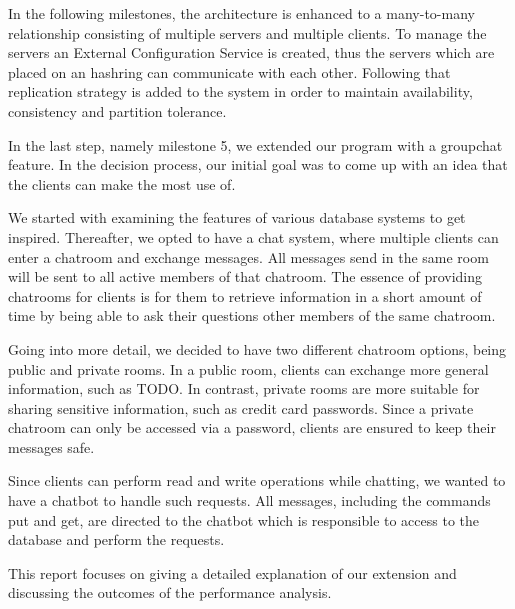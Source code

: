 In the following milestones, the architecture is enhanced to a many-to-many relationship consisting of multiple servers and multiple clients. To manage the servers an External Configuration Service is created, thus the servers which are placed on an hashring can communicate with each other. Following that replication strategy is added to the system in order to maintain availability, consistency and partition tolerance. 

In the last step, namely milestone 5, we extended our program with a groupchat feature. In the decision process, our initial goal was to come up with an idea that the clients can make the most use of.

We started with examining the features of various database systems to get inspired. Thereafter, we opted to have a chat system, where multiple clients can enter a chatroom and exchange messages. All messages send in the same room will be sent to all active members of that chatroom. The essence of providing chatrooms for clients is for them to retrieve information in a short amount of time by being able to ask their questions other members of the same chatroom. 

Going into more detail, we decided to have two different chatroom options, being public and private rooms. In a public room, clients can exchange more general information, such as TODO. In contrast, private rooms are more suitable for sharing sensitive information, such as credit card passwords. Since a private chatroom can only be accessed via a password, clients are ensured to keep their messages safe.

Since clients can perform read and write operations while chatting, we wanted to have a chatbot to handle such requests. All messages, including the commands put and get, are directed to the chatbot which is responsible to access to the database and perform the requests.
 
This report focuses on giving a detailed explanation of our extension and discussing the outcomes of the performance analysis.
